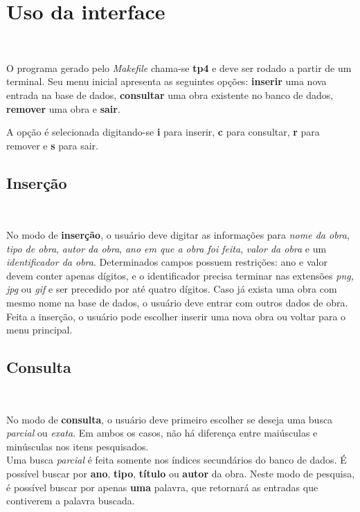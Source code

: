 \documentclass{article}
\begin{document}
\section{Uso da interface}\

O programa gerado pelo \textit{Makefile} chama-se \textbf{tp4} e deve ser rodado a partir de um terminal. Seu menu inicial apresenta as seguintes opções: \textbf{inserir} uma nova entrada na base de dados, \textbf{consultar} uma obra existente no banco de dados, \textbf{remover} uma obra e \textbf{sair}.

A opção é selecionada digitando-se \textbf{i} para inserir, \textbf{c} para consultar, \textbf{r} para remover e \textbf{s} para sair.\\

\subsection{Inserção}\

No modo de \textbf{inserção}, o usuário deve digitar as informações para \textit{nome da obra}, \textit{tipo de obra}, \textit{autor da obra}, \textit{ano em que a obra foi feita}, \textit{valor da obra} e um \textit{identificador da obra}. Determinados campos possuem restrições: ano e valor devem conter apenas dígitos, e o identificador precisa terminar nas extensões \textit{png, jpg} ou \textit{gif} e ser precedido por até quatro dígitos. Caso já exista uma obra com mesmo nome na base de dados, o usuário deve entrar com outros dados de obra. Feita a inserção, o usuário pode escolher inserir uma nova obra ou voltar para o menu principal.\\

\subsection{Consulta}\

No modo de \textbf{consulta}, o usuário deve primeiro escolher se deseja uma busca \textit{parcial} ou \textit{exata}. Em ambos os casos, não há diferença entre maiúsculas e minúsculas nos itens pesquisados.\\

Uma busca \textit{parcial} é feita somente nos índices secundários do banco de dados. É possível buscar por \textbf{ano}, \textbf{tipo}, \textbf{título} ou \textbf{autor} da obra. Neste modo de pesquisa, é possível buscar por apenas \textbf{uma} palavra, que retornará as entradas que contiverem a palavra buscada.\\
\end{document}
